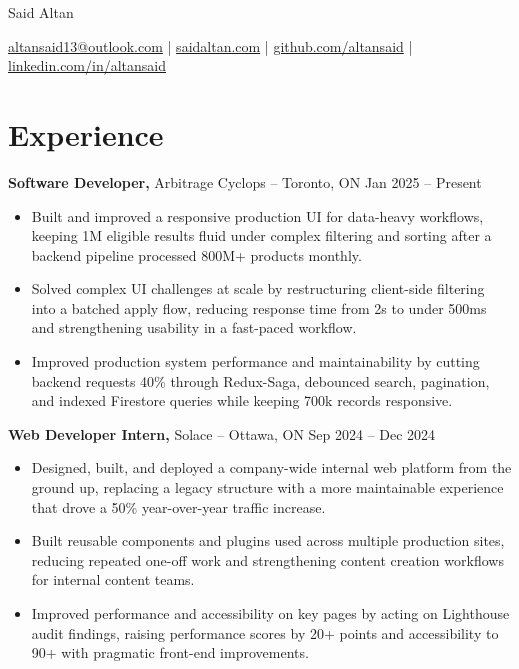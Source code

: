 \documentclass[11pt]{article}       %
\begin{document}
\centerline{\Huge Said Altan}

\vspace{10pt}

\centerline{\href{mailto:altansaid13@outlook.com}{altansaid13@outlook.com} | \href{https://saidaltan.com}{saidaltan.com} | \href{https://github.com/altansaid}{github.com/altansaid} | \href{https://www.linkedin.com/in/altansaid}{linkedin.com/in/altansaid}}


\vspace{5pt}
\section*{Experience}
\textbf{Software Developer,} {Arbitrage Cyclops} -- Toronto, ON \hfill Jan 2025 -- Present \\
\vspace{-9pt}
\begin{itemize}
  \item Built and improved a responsive production UI for data-heavy workflows, keeping 1M eligible results fluid under complex filtering and sorting after a backend pipeline processed 800M+ products monthly.
  \item Solved complex UI challenges at scale by restructuring client-side filtering into a batched apply flow, reducing response time from 2s to under 500ms and strengthening usability in a fast-paced workflow.
  \item Improved production system performance and maintainability by cutting backend requests 40\% through Redux-Saga, debounced search, pagination, and indexed Firestore queries while keeping 700k records responsive.
\end{itemize}

\textbf{Web Developer Intern,} {Solace} -- Ottawa, ON \hfill Sep 2024 -- Dec 2024 \\
\vspace{-9pt}
\begin{itemize}
  \item Designed, built, and deployed a company-wide internal web platform from the ground up, replacing a legacy structure with a more maintainable experience that drove a 50\% year-over-year traffic increase.
  \item Built reusable components and plugins used across multiple production sites, reducing repeated one-off work and strengthening content creation workflows for internal content teams.
  \item Improved performance and accessibility on key pages by acting on Lighthouse audit findings, raising performance scores by 20+ points and accessibility to 90+ with pragmatic front-end improvements.
\end{itemize}
\end{document}

